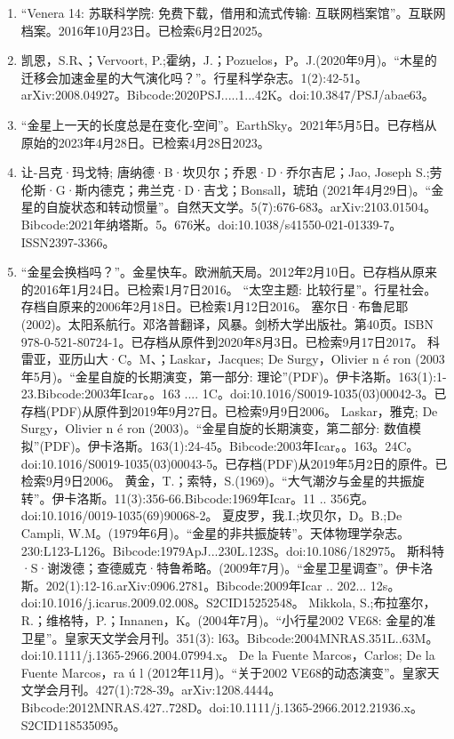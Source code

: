 \begin{enumerate}
\item “Venera 14: 苏联科学院: 免费下载，借用和流式传输: 互联网档案馆”。互联网档案。2016年10月23日。已检索6月2日2025。
\item 凯恩，S.R、；Vervoort, P.;霍纳，J.；Pozuelos，P。J.(2020年9月)。“木星的迁移会加速金星的大气演化吗？”。行星科学杂志。1(2):42-51。arXiv:2008.04927。Bibcode:2020PSJ.....1...42K。doi:10.3847/PSJ/abae63。
\item “金星上一天的长度总是在变化-空间”。EarthSky。2021年5月5日。已存档从原始的2023年4月28日。已检索4月28日2023。
\item 让-吕克·玛戈特; 唐纳德·B·坎贝尔；乔恩·D·乔尔吉尼；Jao, Joseph S.;劳伦斯·G·斯内德克；弗兰克·D·吉戈；Bonsall，琥珀 (2021年4月29日)。“金星的自旋状态和转动惯量”。自然天文学。5(7):676-683。arXiv:2103.01504。Bibcode:2021年纳塔斯。5。676米。doi:10.1038/s41550-021-01339-7。ISSN2397-3366。 
\item “金星会换档吗？”。金星快车。欧洲航天局。2012年2月10日。已存档从原来的2016年1月24日。已检索1月7日2016。
 “太空主题: 比较行星”。行星社会。存档自原来的2006年2月18日。已检索1月12日2016。
 塞尔日·布鲁尼耶(2002)。太阳系航行。邓洛普翻译，风暴。剑桥大学出版社。第40页。ISBN 978-0-521-80724-1。已存档从原件到2020年8月3日。已检索9月17日2017。
 科雷亚，亚历山大·C。M、；Laskar，Jacques; De Surgy，Olivier n é ron (2003年5月)。“金星自旋的长期演变，第一部分: 理论”(PDF)。伊卡洛斯。163(1):1-23.Bibcode:2003年Icar。。163 .... 1C。doi:10.1016/S0019-1035(03)00042-3。已存档(PDF)从原件到2019年9月27日。已检索9月9日2006。
 Laskar，雅克; De Surgy，Olivier n é ron (2003)。“金星自旋的长期演变，第二部分: 数值模拟”(PDF)。伊卡洛斯。163(1):24-45。Bibcode:2003年Icar。。163。24C。doi:10.1016/S0019-1035(03)00043-5。已存档(PDF)从2019年5月2日的原件。已检索9月9日2006。
 黄金，T.；索特，S.(1969)。“大气潮汐与金星的共振旋转”。伊卡洛斯。11(3):356-66.Bibcode:1969年Icar。11 .. 356克。doi:10.1016/0019-1035(69)90068-2。
 夏皮罗，我.I.;坎贝尔，D。B.;De Campli, W.M。(1979年6月)。“金星的非共振旋转”。天体物理学杂志。230:L123-L126。Bibcode:1979ApJ...230L.123S。doi:10.1086/182975。
 斯科特·S·谢泼德；查德威克·特鲁希略。(2009年7月)。“金星卫星调查”。伊卡洛斯。202(1):12-16.arXiv:0906.2781。Bibcode:2009年Icar .. 202... 12s。doi:10.1016/j.icarus.2009.02.008。S2CID15252548。 
 Mikkola, S.;布拉塞尔，R.；维格特，P.；Innanen，K。(2004年7月)。“小行星2002 VE68: 金星的准卫星”。皇家天文学会月刊。351(3): l63。Bibcode:2004MNRAS.351L..63M。doi:10.1111/j.1365-2966.2004.07994.x。
 De la Fuente Marcos，Carlos; De la Fuente Marcos，ra ú l (2012年11月)。“关于2002 VE68的动态演变”。皇家天文学会月刊。427(1):728-39。arXiv:1208.4444。Bibcode:2012MNRAS.427..728D。doi:10.1111/j.1365-2966.2012.21936.x。S2CID118535095。 
\end{enumerate}
